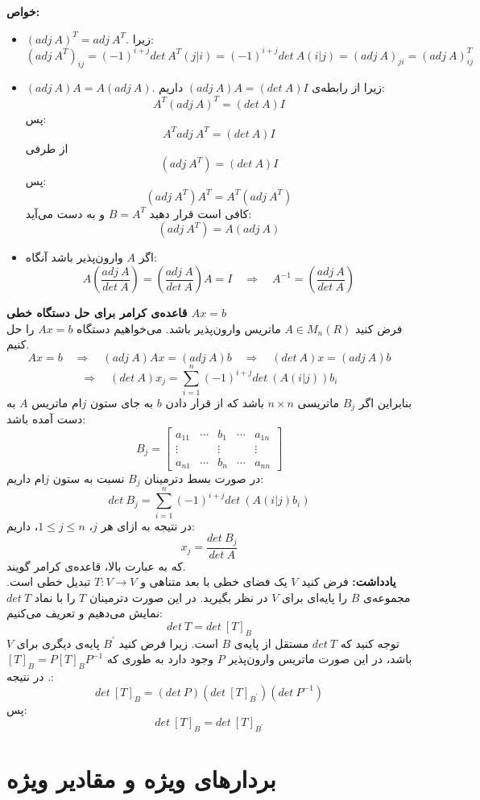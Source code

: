 \textbf{خواص:}
\begin{itemize}
	\item $(adj\: A)^T = adj\: A^T$. زیرا:
	$$(adj\: A^T)_{ij} = (-1)^{i+j} det\:A^T(j|i) = (-1)^{i+j}det\: A(i|j) = (adj\: A)_{ji}= (adj\: A)_{ij}^T$$
	\item $(adj\: A)A = A(adj\: A)$. زیرا از رابطه‌ی ${(adj\:A)A = (det\:A)I}$ داریم: $${A^T(adj\:A)^T = (det\:A) I}$$
	پس:
	$$A^Tadj\:A^T = (det\:A)I$$
	از طرفی 
	$$(adj\: A^T) = (det\: A)I$$
	پس:
	$$(adj\: A^T)A^T = A^T(adj\: A^T)$$
	کافی است قرار دهید $B = A^T$ و به دست می‌آید:
	$$(adj\:A^T) = A(adj\: A)$$
	\item اگر $A$ وارون‌پذیر باشد آنگاه:
	$$A(\frac{adj\: A}{det\: A}) = (\frac{adj\:A}{det\: A})A = I \quad \Rightarrow \quad A^{-1} = (\frac{adj\:A}{det\: A})$$
\end{itemize}
\textbf{قاعده‌ی کرامر برای حل دستگاه خطی $Ax = b$}\\
فرض کنید $A\in M_n(R)$ ماتریس وارون‌پذیر باشد. می‌خواهیم دستگاه $Ax=b$ را حل کنیم.
$$Ax = b \quad \Rightarrow \quad (adj\:A)Ax = (adj\:A)b \quad\Rightarrow\quad (det\:A)x = (adj\: A)b$$
$$\Rightarrow\quad (det\:A)x_j = \sum_{i=1}^n(-1)^{i+j}det\:(A(i|j))b_i$$
بنابراین اگر $B_j$ ماتریسی $n\times n$ باشد که از قرار دادن $b$ به جای ستون $j$ام ماتریس $A$ به دست آمده باشد:
$$B_j = \begin{bmatrix}
a_{11} &\cdots&b_1 & \cdots& a_{1n}\\
\vdots && \vdots&& \vdots\\
a_{n1} & \cdots & b_n & \cdots & a_{nn}
\end{bmatrix}$$
در صورت بسط دترمینان $B_j$ نسبت به ستون $j$ام داریم:
$$det\: B_j = \sum_{i=1}^n (-1)^{i+j}det\:(A(i|j)b_i)$$
در نتیجه به ازای هر $j$، $1\leq j \leq n$، داریم:
$$x_j = \frac{det\: B_j}{det\: A}$$
که به عبارت بالا، قاعده‌ی کرامر گویند.\\
\textbf{یادداشت:} فرض کنید $V$ یک فضا‌ی خطی با بعد متناهی و $T: V \rightarrow V$ تبدیل خطی است. مجموعه‌ی $B$ را پایه‌ای برای $V$ در نظر بگیرید. در این صورت دترمینان $T$ را با نماد $det\:T$ نمایش می‌دهیم و تعریف می‌کنیم:
$$det\: T = det\: [T]_B$$
توجه کنید که $det\:T$ مستقل از پایه‌ی $B$ است. زیرا فرض کنید $B^\prime$ پایه‌ی دیگری برای $V$ باشد، در این صورت ماتریس وارون‌پذیر $P$ وجود دارد به طوری که $[T]_B = P[T]_BP^{-1}$. در نتیجه:
$$det\: [T]_B = (det\: P)(det\: [T]_{B^\prime})(det\: P^{-1})$$
پس:
$$det\: [T]_B = det\: [T]_{B^\prime}$$

\chapter{بردارهای ویژه و مقادیر ویژه}

